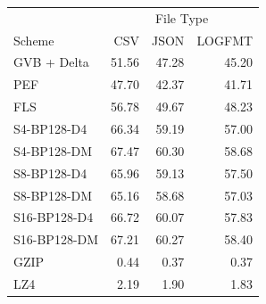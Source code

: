 \begin{tabular}{lrrr}
\toprule
 & \multicolumn{3}{c}{File Type} \\
Scheme & CSV & JSON & LOGFMT \\
\midrule
GVB + Delta & 51.56 & 47.28 & 45.20 \\
PEF & 47.70 & 42.37 & 41.71 \\
FLS & 56.78 & 49.67 & 48.23 \\
S4-BP128-D4 & 66.34 & 59.19 & 57.00 \\
S4-BP128-DM & 67.47 & 60.30 & 58.68 \\
S8-BP128-D4 & 65.96 & 59.13 & 57.50 \\
S8-BP128-DM & 65.16 & 58.68 & 57.03 \\
S16-BP128-D4 & 66.72 & 60.07 & 57.83 \\
S16-BP128-DM & 67.21 & 60.27 & 58.40 \\
GZIP & 0.44 & 0.37 & 0.37 \\
LZ4 & 2.19 & 1.90 & 1.83 \\
\bottomrule
\end{tabular}

